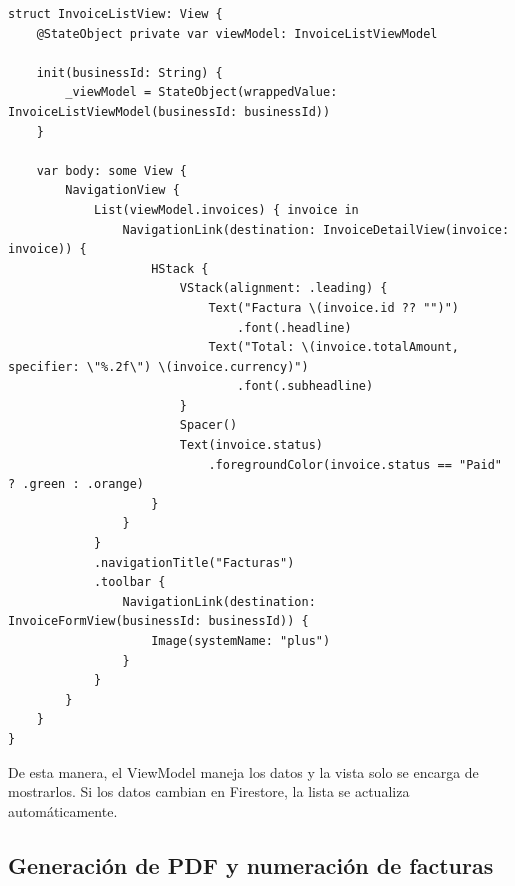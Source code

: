 \begin{large}
\begin{verbatim}
struct InvoiceListView: View {
    @StateObject private var viewModel: InvoiceListViewModel

    init(businessId: String) {
        _viewModel = StateObject(wrappedValue: InvoiceListViewModel(businessId: businessId))
    }

    var body: some View {
        NavigationView {
            List(viewModel.invoices) { invoice in
                NavigationLink(destination: InvoiceDetailView(invoice: invoice)) {
                    HStack {
                        VStack(alignment: .leading) {
                            Text("Factura \(invoice.id ?? "")")
                                .font(.headline)
                            Text("Total: \(invoice.totalAmount, specifier: \"%.2f\") \(invoice.currency)")
                                .font(.subheadline)
                        }
                        Spacer()
                        Text(invoice.status)
                            .foregroundColor(invoice.status == "Paid" ? .green : .orange)
                    }
                }
            }
            .navigationTitle("Facturas")
            .toolbar {
                NavigationLink(destination: InvoiceFormView(businessId: businessId)) {
                    Image(systemName: "plus")
                }
            }
        }
    }
}
\end{verbatim}

De esta manera, el ViewModel maneja los datos y la vista solo se encarga de mostrarlos. Si los datos cambian en Firestore, la lista se actualiza automáticamente.

\end{large}

\subsection{Generación de PDF y numeración de facturas}

